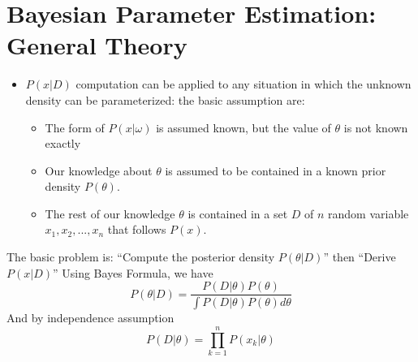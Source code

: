 \section{Bayesian Parameter Estimation: General Theory}

\begin{itemize}
	\item $P(x | D)$ computation can be applied to any situation in which the unknown density can be parameterized:  the basic assumption are: 
	\begin{itemize}
		\item The form of $P(x | \omega)$ is assumed known, but the value of $\theta$ is not known exactly 
		\item Our knowledge about $\theta$ is assumed to be contained in a known prior density $P(\theta)$.
		\item The rest of our knowledge $\theta$ is contained in a set $D$ of $n$ random variable $x_1, x_2,..., x_n$ that follows $P(x)$.
	\end{itemize}
\end{itemize}

The basic problem is: ``Compute the posterior density $P(\theta | D)$'' then ``Derive $P(x | D)$''
Using Bayes Formula, we have 
\begin{equation}
	P( \theta | D) = \frac{ P(D | \theta) P(\theta) } { \int P(D | \theta ) P( \theta) d \theta  }
\end{equation}
And by independence assumption
\begin{equation}
	P( D | \theta) = \prod _{k=1} ^n P( x_k | \theta)
\end{equation}

